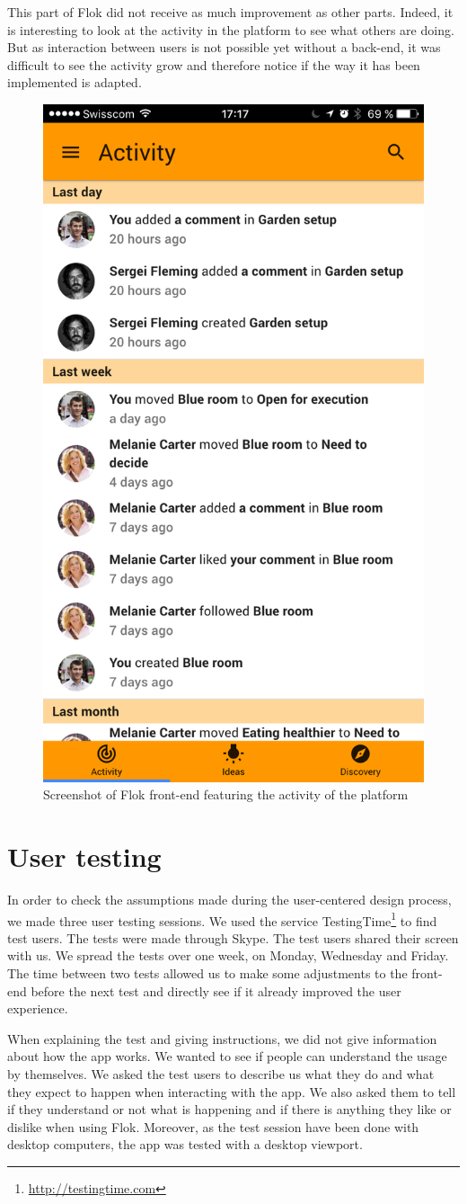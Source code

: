 \documentclass[a4paper,12pt,twoside]{article}
\begin{document}
This part of Flok did not receive as much improvement as other parts.
Indeed, it is interesting to look at the activity in the platform to see what others are doing.
But as interaction between users is not possible yet without a back-end, it was difficult to see the activity grow and therefore notice if the way it has been implemented is adapted.

\begin{figure}[!htb]
    \centering
    \includegraphics[width=.32\textwidth]{images/activity.png}
    \caption{Screenshot of Flok front-end featuring the activity of the platform}
    \label{fig.activity}
\end{figure}

\section{User testing}
In order to check the assumptions made during the user-centered design process, we made three user testing sessions.
We used the service TestingTime\footnote{\url{http://testingtime.com}} to find test users.
The tests were made through Skype.
The test users shared their screen with us.
We spread the tests over one week, on Monday, Wednesday and Friday.
The time between two tests allowed us to make some adjustments to the front-end before the next test and directly see if it already improved the user experience.

When explaining the test and giving instructions, we did not give information about how the app works.
We wanted to see if people can understand the usage by themselves.
We asked the test users to describe us what they do and what they expect to happen when interacting with the app.
We also asked them to tell if they understand or not what is happening and if there is anything they like or dislike when using Flok.
Moreover, as the test session have been done with desktop computers, the app was tested with a desktop viewport.
\end{document}
